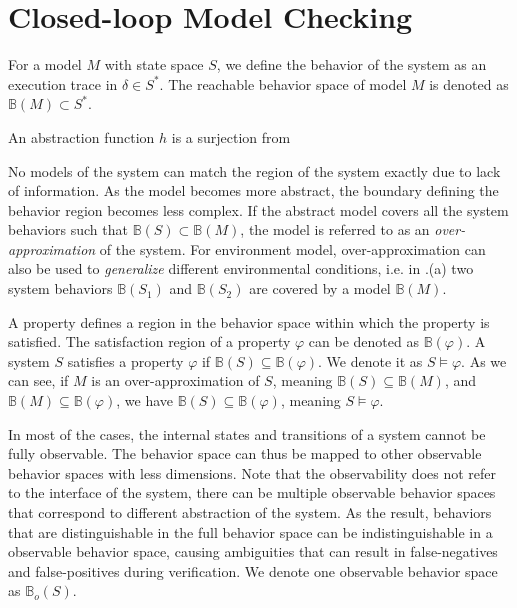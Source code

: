 \section{Closed-loop Model Checking}
For a model $M$ with state space $S$, we define the behavior of the system as an execution trace in $\delta\in S^*$. The reachable behavior space of model $M$ is denoted as $\mathbb{B}(M)\subset S^*$.

An abstraction function $h$ is a surjection from

No models of the system can match the region of the system exactly due to lack of information. As the model becomes more abstract, the boundary defining the behavior region becomes less complex. If the abstract model covers all the system behaviors such that $\mathbb{B}(S)\subset\mathbb{B}(M)$, the model is referred to as an \emph{over-approximation} of the system. For environment model, over-approximation can also be used to \emph{generalize} different environmental conditions, i.e. in .(a) two system behaviors $\mathbb{B}(S_1)$ and $\mathbb{B}(S_2)$ are covered by a model $\mathbb{B}(M)$.

A property defines a region in the behavior space within which the property is satisfied. The satisfaction region of a property $\varphi$ can be denoted as $\mathbb{B}(\varphi)$. 
A system $S$ satisfies a property $\varphi$ if $\mathbb{B}(S)\subseteq \mathbb{B}(\varphi)$. We denote it as $S\models\varphi$. As we can see, if $M$ is an over-approximation of $S$, meaning $\mathbb{B}(S)\subseteq \mathbb{B}(M)$, and $\mathbb{B}(M)\subseteq \mathbb{B}(\varphi)$, we have $\mathbb{B}(S)\subseteq \mathbb{B}(\varphi)$, meaning $S\models\varphi$. 

In most of the cases, the internal states and transitions of a system cannot be fully observable. The behavior space can thus be mapped to other observable behavior spaces with less dimensions.
Note that the observability does not refer to the interface of the system, there can be multiple observable behavior spaces that correspond to different abstraction of the system. As the result, behaviors that are distinguishable in the full behavior space can be indistinguishable in a observable behavior space, causing ambiguities that can result in false-negatives and false-positives during verification. We denote one observable behavior space as $\mathbb{B}_o(S)$. 

